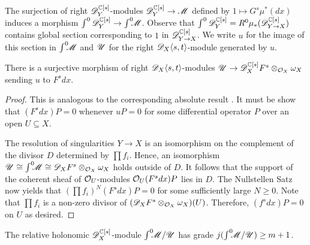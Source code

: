   The surjection of right $\mathscr{D}_Y^{\mathbb{C}[s]}$-modules $\mathscr{D}_Y^{\mathbb{C}[s]}\to \mathscr{M}$ defined by $1\mapsto G^s \mu^*(dx)$ induces a morphism $\int^{0} \mathscr{D}_Y^{\mathbb{C}[s]} \to \int^0 \mkern -8mu\mathscr{M}$.
  Observe that $\int^0 \mathscr{D}_Y^{\mathbb{C}[s]} = R^0\mu_*(\mathscr{D}_{Y\to X}^{\mathbb{C}[s]})$ contains global section corresponding to $1$ in $\mathscr{D}_{Y\to X}^{\mathbb{C}[s]}$.
  We write $u$ for the image of this section in $\int^0 \mkern -8mu \mathscr{M}$ and $\mathscr{U}$ for the right $\mathscr{D}_X\langle s,t\rangle$-module generated by $u$.
  \begin{lemma}\label{lem: SurjectionUF}
  There is a surjective morphism of right $\mathscr{D}_X\langle s,t \rangle$-modules $\mathscr{U}\to \mathscr{D}_X^{\mathbb{C}[s]}F^s \otimes_{\mathcal{O}_X}\omega_X$ sending $u$ to $F^sdx$.
\end{lemma}
\begin{proof}
  This is analogous to the corresponding absolute result \cite[Chapter 5, p246]{bjork1979rings}.
  It must be show that $(F^s dx)P = 0$ whenever $uP = 0$ for some differential operator $P$ over an open $U\subseteq X$.

  The resolution of singularities $Y\to X$ is an isomorphism on the complement of the divisor $D$ determined by $\prod f_i$.
  Hence, an isomorphism $\mathscr{U} \cong \int^0 \mkern -8mu \mathscr{M} \cong  \mathscr{D}_X F^s  \otimes_{\mathcal{O}_X}\omega_X$ holds outside of $D$.
  It follows that the support of the coherent sheaf of $\mathcal{O}_U$-modules $\mathcal{O}_U (F^s dx) P $ lies in $D$.
  The Nullstellen Satz now yields that $(\prod f_i)^N (F^s dx) P  = 0$ for some sufficiently large $N\geq 0$.
  Note that $\prod f_i$ is a non-zero divisor of $(\mathscr{D}_X F^s\otimes_{\mathcal{O}_X} \omega_X)(U)$.
  Therefore, $(f^s dx) P= 0$ on $U$ as desired.
\end{proof}
\begin{lemma}\label{lem: GradeNPlusOne}
  The relative holonomic $\mathscr{D}_X^{\mathbb{C}[s]}$-module $\int^0 \mkern -8mu\mathscr{M}/\mathscr{U}$ has grade $j(\int^0 \mkern -8mu\mathscr{M}/\mathscr{U})\geq m+1$.
\end{lemma}
